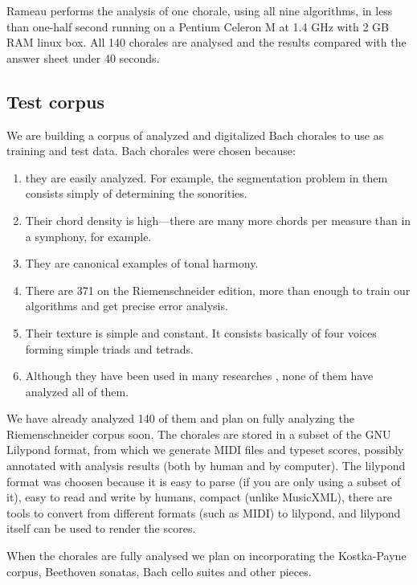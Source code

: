 \documentclass{article}
\begin{document}
Rameau performs the analysis of one chorale, using all nine
algorithms, in less than one-half second running on a Pentium Celeron
M at 1.4 GHz with 2 GB RAM linux box. All 140 chorales are analysed
and the results compared with the answer sheet under 40 seconds.

\subsection{Test corpus}
\label{sec:test-corpus}

We are building a corpus of analyzed and digitalized Bach chorales to
use as training and test data. Bach chorales were chosen because:

\begin{enumerate}
\item they are easily analyzed. For example, the segmentation problem in
them consists simply of determining the sonorities.
\item Their chord density is high---there are many more chords per
  measure than in a symphony, for example.
\item They are canonical examples of tonal harmony.
\item There are 371 on the Riemenschneider edition, more than
  enough to train our algorithms and get precise error analysis.
\item Their texture is simple and constant. It consists basically of
  four voices forming simple triads and tetrads.
\item Although they have been used in many researches \cite{taube:automatic,
    tsui:harmonic, illescas.ea:harmonic, winograd:linguistics}, none
  of them have analyzed all of them.
\end{enumerate}

We have already analyzed 140 of them and plan on fully analyzing the
Riemenschneider corpus soon. The chorales are stored in a subset of
the GNU Lilypond format, from which we generate MIDI files and typeset
scores, possibly annotated with analysis results (both by human and by
computer). The lilypond format was choosen because it is easy to parse
(if you are only using a subset of it), easy to read and write by
humans, compact (unlike MusicXML), there are tools to convert from
different formats (such as MIDI) to lilypond, and lilypond itself can
be used to render the scores.

When the chorales are fully analysed we plan on incorporating the
Kostka-Payne \cite{kostka.ea:tonal} corpus, Beethoven sonatas, Bach
cello suites and other pieces.
\end{document}
